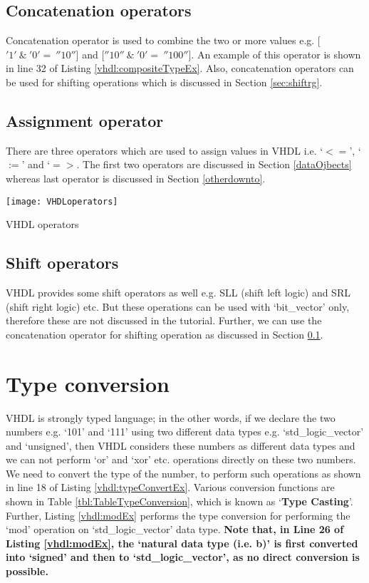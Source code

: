 \subsection{Concatenation operators}\label{concatenationOp}
Concatenation operator is used to combine the two or more values e.g. [$'1'{ \ }\& { \ }'0' = { \ }''$$10''$] and [$''10''{ \ }\& { \ }'0' = { \ }''$$100''$]. An example of this operator is shown in line 32 of Listing \ref{vhdl:compositeTypeEx}. Also, concatenation operators can be used for shifting operations which is discussed in Section \ref{sec:shiftrg}. 

\subsection{Assignment operator}
There are three operators which are used to assign values in VHDL i.e. `$<=$', `$:=$' and `$=>$. The first two operators are discussed in Section \ref{dataOjbects} whereas last operator is discussed in Section \ref{otherdownto}. 
\begin{table}[!h]
	\centering
	\texttt{[image: VHDLoperators]}
	\caption{VHDL operators}
	\label{tbl:VHDLoperators}
\end{table}

\subsection{Shift operators}
VHDL provides some shift operators as well e.g. SLL (shift left logic) and SRL (shift right logic) etc. But these operations can be used with `bit\_vector' only, therefore these are not discussed in the tutorial. Further, we can use the concatenation operator for shifting operation as discussed in Section \ref{concatenationOp}. 

\section{Type conversion}\label{sec:typeconversion}
VHDL is strongly typed language; in the other words, if we declare the two numbers e.g. `101' and `111' using two different data types e.g. `std\_logic\_vector' and `unsigned', then VHDL considers these numbers as different data types and we can not perform `or' and `xor' etc. operations directly on these two numbers. We need to convert the type of the number, to perform such operations as shown in line 18 of Listing \ref{vhdl:typeConvertEx}. Various conversion functions are shown in Table \ref{tbl:TableTypeConversion}, which is known as `\textbf{Type Casting}'. Further, Listing \ref{vhdl:modEx} performs the type conversion for performing the `mod' operation on `std\_logic\_vector' data type. \textbf{Note that, in Line 26 of Listing \ref{vhdl:modEx}, the `natural data type (i.e. b)' is first converted into `signed' and then to `std\_logic\_vector', as no direct conversion is possible. }

